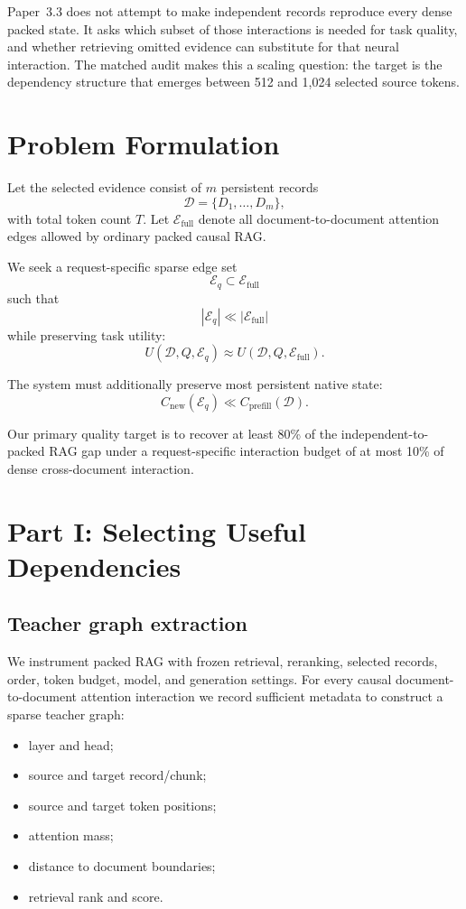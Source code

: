 \documentclass[11pt]{article}
\begin{document}
Paper~3.3 does not attempt to make independent records reproduce every dense
packed state. It asks which subset of those interactions is needed for task
quality, and whether retrieving omitted evidence can substitute for that neural
interaction. The matched audit makes this a scaling question: the target is the
dependency structure that emerges between 512 and 1,024 selected source tokens.
\FloatBarrier

\section{Problem Formulation}

Let the selected evidence consist of $m$ persistent records
\[
\mathcal D=\{D_1,\ldots,D_m\},
\]
with total token count $T$. Let $\mathcal E_{\mathrm{full}}$ denote all
document-to-document attention edges allowed by ordinary packed causal RAG.

We seek a request-specific sparse edge set
\[
\mathcal E_q \subset \mathcal E_{\mathrm{full}}
\]
such that
\[
|\mathcal E_q| \ll |\mathcal E_{\mathrm{full}}|
\]
while preserving task utility:
\[
U(\mathcal D,Q,\mathcal E_q)
\approx
U(\mathcal D,Q,\mathcal E_{\mathrm{full}}).
\]

The system must additionally preserve most persistent native state:
\[
C_{\mathrm{new}}(\mathcal E_q)
\ll
C_{\mathrm{prefill}}(\mathcal D).
\]

Our primary quality target is to recover at least 80\% of the
independent-to-packed RAG gap under a request-specific interaction budget of at
most 10\% of dense cross-document interaction.

\section{Part I: Selecting Useful Dependencies}

\subsection{Teacher graph extraction}

We instrument packed RAG with frozen retrieval, reranking, selected records,
order, token budget, model, and generation settings. For every causal
document-to-document attention interaction we record sufficient metadata to
construct a sparse teacher graph:
\begin{itemize}[leftmargin=*]
    \item layer and head;
    \item source and target record/chunk;
    \item source and target token positions;
    \item attention mass;
    \item distance to document boundaries;
    \item retrieval rank and score.
\end{itemize}
\end{document}
